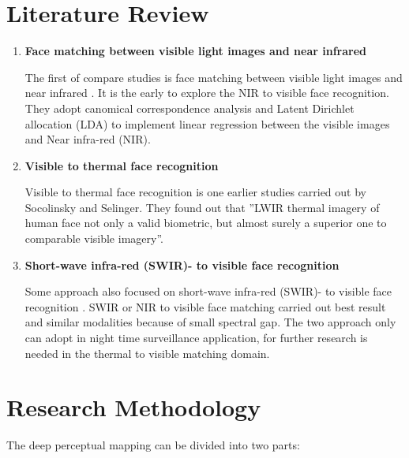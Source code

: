\documentclass[a4paper, 12pt]{article}
\begin{document}
\section{Literature Review} 
\begin{enumerate}[I]

\item \textbf{{\large Face matching between visible light images and near infrared}}

The first of compare studies is face matching between visible light images and near infrared \cite{20}. It is the early to explore the NIR to visible face recognition. They adopt canomical correspondence analysis and Latent Dirichlet allocation (LDA) to implement linear regression between the visible images and Near infra-red (NIR).


\item \textbf{{\large Visible to thermal face recognition}}

Visible to thermal face recognition \cite{18} is one earlier studies carried out by Socolinsky and Selinger. They found out that ''LWIR thermal imagery of human face not only a valid biometric, but almost surely a superior one to comparable visible imagery''.

\item \textbf{{\large Short-wave infra-red (SWIR)- to visible face recognition}}

Some approach also focused on short-wave infra-red (SWIR)- to visible face recognition \cite{16} \cite{17}. SWIR or NIR to visible face matching carried out best result and similar modalities because of small spectral gap. The two approach only can adopt in night time surveillance application, for further research is needed in the thermal to visible matching domain.

\end{enumerate}

\section{Research Methodology} 

The deep perceptual mapping \cite{DBLP:journals/corr/SarfrazS15} can be divided into two parts:
\end{document}
